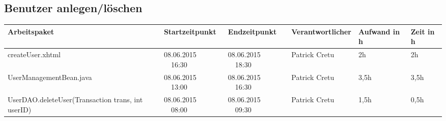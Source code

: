 \begin{landscape}
	\subsection{Benutzer anlegen/löschen}
	\begin{tabular}{|p{10.3cm}|p{3.2cm}|p{3.2cm}|p{3.5cm}|p{1.7cm}|p{1.5cm}|}
		\hline  \textbf{Arbeitspaket} & \textbf{Startzeitpunkt} & \textbf{Endzeitpunkt} & \textbf{Verantwortlicher}  & \textbf{Aufwand in h} & \textbf{Zeit in h}\\ 
		\hline   createUser.xhtml                                      & 08.06.2015 \ \ 16:30        & 08.06.2015 \ \ 18:30        &  Patrick Cretu &  2h       & 2h\\ 
		\hline   UserManagementBean.java                               & 08.06.2015 \ \ 13:00        & 08.06.2015 \ \ 16:30        &  Patrick Cretu	&  3,5h     & 3,5h\\ 
		\hline   UserDAO.deleteUser(Transaction trans, int userID)     & 08.06.2015 \ \ 08:00        & 08.06.2015 \ \ 09:30        &  Patrick Cretu &  1,5h     & 0,5h\\ 
		\hline 
	\end{tabular} \ \\
	\ \\
	

\end{landscape}
